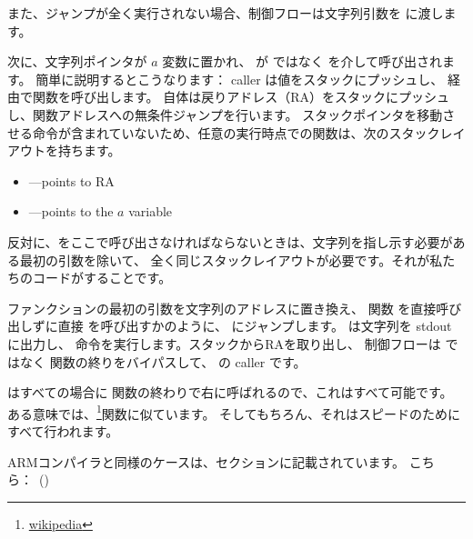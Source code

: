 また、ジャンプが全く実行されない場合、制御フローは文字列引数を \printf に渡します。

\label{jump_to_last_printf}
\myindex{\Stack}

次に、文字列ポインタが $a$ 変数に置かれ、 \printf が \CALL ではなく \JMP を介して呼び出されます。 
簡単に説明するとこうなります：
\gls{caller} は値をスタックにプッシュし、 \CALL 経由で関数を呼び出します。
\CALL 自体は戻りアドレス（\ac{RA}）をスタックにプッシュし、関数アドレスへの無条件ジャンプを行います。
スタックポインタを移動させる命令が含まれていないため、任意の実行時点での関数は、次のスタックレイアウトを持ちます。

\begin{itemize}
\item\ESP---points to \ac{RA}
\item{}---points to the $a$ variable 
\end{itemize}

反対に、\printf をここで呼び出さなければならないときは、文字列を指し示す必要がある最初の\printf 引数を除いて、
全く同じスタックレイアウトが必要です。それが私たちのコードがすることです。

ファンクションの最初の引数を文字列のアドレスに置き換え、
関数 \ttf を直接呼び出しずに直接 \printf を呼び出すかのように、 \printf にジャンプします。
\printf は文字列を \gls{stdout} に出力し、 \RET 命令を実行します。スタックから\ac{RA}を取り出し、
制御フローは \ttf ではなく \ttf 関数の終りをバイパスして、 \ttf の \gls{caller} です。

\newcommand{\URLSJ}{\href{http://en.wikipedia.org/wiki/Setjmp.h}{wikipedia}}

\printf はすべての場合に  \ttf 関数の終わりで右に呼ばれるので、これはすべて可能です。
ある意味では、\footnote{\URLSJ}関数に似ています。
そしてもちろん、それはスピードのためにすべて行われます。

ARMコンパイラと同様のケースは、\q{\PrintfSeveralArgumentsSectionName}セクションに記載されています。
こちら：~()




